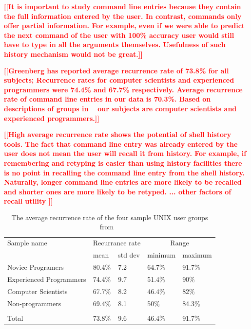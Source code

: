 \documentclass[thesis=M,english]{FITthesis}[2012/10/20]
\newcommand{\todotext}[1]{\textcolor{red}{\textbf{[[#1]]}}}
\let\myCite\cite
\renewcommand\cite{\unskip~\myCite}
\begin{document}
\todotext{It is important to study command line entries because they contain the full information entered by the user. In contrast, commands only offer partial information. For example, even if we were able to predict the next command of the user with 100\% accuracy user would still have to type in all the arguments themselves. Usefulness of such history mechanism would not be great.}

\todotext{Greenberg has reported average recurrence rate of 73.8\% for all subjects; Recurrence rates for computer scientists and experienced programmers were 74.4\% and 67.7\% respectively. Average recurrence rate of command line entries in our data is 70.3\%. Based on descriptions of groups in \cite{greenberg1993computer} our subjects are computer scientists and experienced programmers.}

\todotext{High average recurrence rate shows the potential of shell history tools. The fact that command line entry was already entered by the user does not mean the user will recall it from history. For example, if remembering and retyping is easier than using history facilities there is no point in recalling the command line entry from the shell history. Naturally, longer command line entries are more likely to be recalled and shorter ones are more likely to be retyped. ... other factors of recall utility }


\begin{table}[]
\centering
\begin{tabular}{lllll}
\hline \hline
Sample name             & \multicolumn{2}{c}{Recurrance rate} & \multicolumn{2}{c}{Range} \\
                        & mean             & std dev          & minimum     & maximum     \\ \hline
Novice Programers       & 80.4\%           & 7.2              & 64.7\%      & 91.7\%      \\
Experienced Programmers & 74.4\%           & 9.7              & 51.4\%      & 90\%        \\
Computer Scientists      & 67.7\%           & 8.2              & 46.4\%      & 82\%        \\
Non-programmers         & 69.4\%           & 8.1              & 50\%        & 84.3\%      \\
                        &                  &                  &             &             \\
Total                   & 73.8\%           & 9.6              & 46.4\%      & 91.7\%      \\ \hline \hline 
\end{tabular}
\caption{The average recurrence rate of the four sample UNIX user groups from \cite{greenberg1993computer}}
\label{tab:recurrence_rate}
\end{table}
\end{document}

